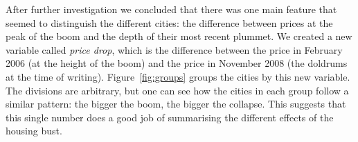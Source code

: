 \documentclass[oneside]{article}
\begin{document}
% 
% 

After further investigation we concluded that there was one main feature that seemed to distinguish the different cities: the difference between prices at the peak of the boom and the depth of their most recent plummet.  We created a new variable called {\em price drop}, which is the difference between the price in February 2006 (at the height of the boom) and the price in November 2008 (the doldrums at the time of writing). Figure~\ref{fig:groups} groups the cities by this new variable.  The divisions are arbitrary, but one can see how the cities in each group follow a similar pattern: the bigger the boom, the bigger the collapse.  This suggests that this single number does a good job of summarising the different effects of the housing bust.
\end{document}
